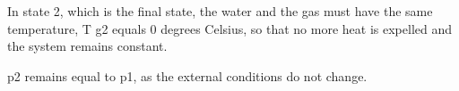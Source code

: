 In state 2, which is the final state, the water and the gas must have the same temperature, T g2 equals 0 degrees Celsius, so that no more heat is expelled and the system remains constant.

p2 remains equal to p1, as the external conditions do not change.